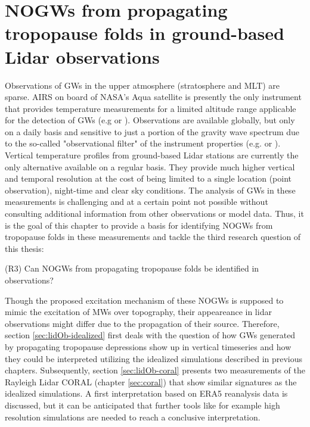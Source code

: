 \chapter{NOGWs from propagating tropopause folds in ground-based Lidar observations}

Observations of GWs in the upper atmosphere (stratosphere and MLT) are sparse. AIRS on board of NASA’s Aqua satellite is presently the only instrument that provides temperature measurements for a limited altitude range applicable for the detection of GWs (e.g \cite[]{hindley_gravity_2019} or \cite[]{hindley_18year_2020}). Observations are available globally, but only on a daily basis and sensitive to just a portion of the gravity wave spectrum due to the so-called "observational filter" of the instrument properties (e.g. \cite[]{preusse_space-based_2002} or \cite[]{alexander_recent_2010}). Vertical temperature profiles from ground-based Lidar stations are currently the only alternative available on a regular basis. They provide much higher vertical and temporal resolution at the cost of being limited to a single location (point observation), night-time and clear sky conditions. The analysis of GWs in these measurements is challenging and at a certain point not possible without consulting additional information from other observations or model data. Thus, it is the goal of this chapter to provide a basis for identifying NOGWs from tropopause folds in these measurements and tackle the third research question of this thesis:

\begin{tcolorbox}[]
    (R3) Can NOGWs from propagating tropopause folds be identified in observations?
\end{tcolorbox}
Though the proposed excitation mechanism of these NOGWs is supposed to mimic the excitation of MWs over topography, their appeareance in lidar observations might differ due to the propagation of their source. Therefore, section \ref{sec:lidOb-idealized} first deals with the question of how GWs generated by propagating tropopause depressions show up in vertical timeseries and how they could be interpreted utilizing the idealized simulations described in previous chapters.
Subsequently, section \ref{sec:lidOb-coral} presents two measurements of the Rayleigh Lidar CORAL (chapter \ref{sec:coral}) that show similar signatures as the idealized simulations. A first interpretation based on ERA5 reanalysis data is discussed, but it can be anticipated that further tools like for example high resolution simulations are needed to reach a conclusive interpretation. 


